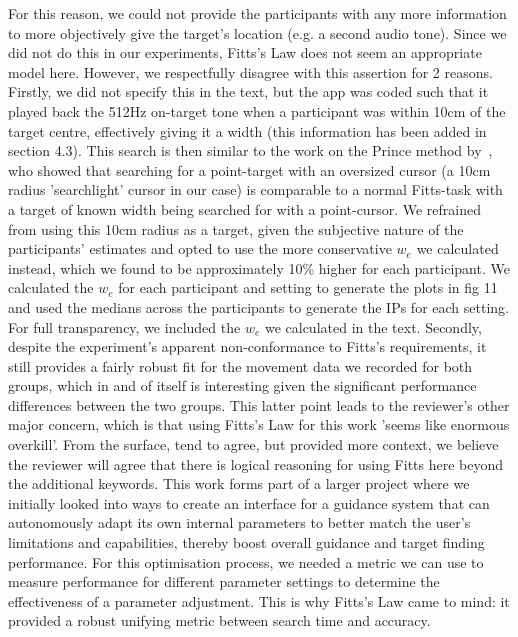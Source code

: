 \documentclass{scrartcl}
\begin{document}
\begin{itemize}
    For this reason, we could not provide the participants with any more information to more objectively give the target's location (e.g. a second audio tone).
    Since we did not do this in our experiments, Fitts's Law does not seem an appropriate model here. 
    However, we respectfully disagree with this assertion for 2 reasons.
    Firstly, we did not specify this in the text, but the app was coded such that it played back the 512Hz on-target tone when a participant was within 10cm of the target centre, effectively giving it a width (this information has been added in section 4.3).
    This search is then similar to the work on the Prince method by~\cite{kabbash1995prince}, who showed that searching for a point-target with an oversized cursor (a 10cm radius 'searchlight' cursor in our case) is comparable to a normal Fitts-task with a target of known width being searched for with a point-cursor.
    We refrained from using this 10cm radius as a target, given the subjective nature of the participants' estimates and opted to use the more conservative $w_e$ we calculated instead, which we found to be approximately 10\% higher for each participant.
    We calculated the $w_e$ for each participant and setting to generate the plots in fig 11 and used the medians across the participants to generate the IPs for each setting.
    For full transparency, we included the $w_e$ we calculated in the text.
    Secondly, despite the experiment's apparent non-conformance to Fitts's requirements, it still provides a fairly robust fit for the movement data we recorded for both groups, which in and of itself is interesting given the significant performance differences between the two groups.
    This latter point leads to the reviewer's other major concern, which is that using Fitts's Law for this work 'seems like enormous overkill'.
    From the surface, tend to agree, but provided more context, we believe the reviewer will agree that there is logical reasoning for using Fitts here beyond the additional keywords.
    This work forms part of a larger project where we initially looked into ways to create an interface for a guidance system that can autonomously adapt its own internal parameters to better match the user's limitations and capabilities, thereby boost overall guidance and target finding performance.
  For this optimisation process, we needed a metric we can use to measure performance for different parameter settings to determine the effectiveness of a parameter adjustment.
  This is why Fitts's Law came to mind: it provided a robust unifying metric between search time and accuracy.

\end{itemize}
\end{document}
